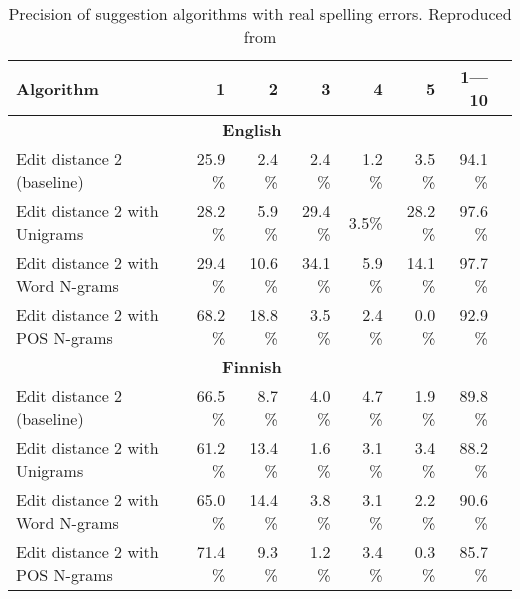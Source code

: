 \documentclass[officiallayout]{unihelcompling}
\begin{document}
\begin{table}
\centering
      \begin{tabular}{lrrrrrrr}
        \hline
        Algorithm & 1 & 2 & 3 & 4 & 5 & 1---10 \\
        \hline
        \multicolumn{7}{c}{\textbf{English}} \\
        \hline
        Edit distance 2 (baseline) 
& 25.9 \% & 2.4 \% & 2.4 \% & 1.2 \% & 3.5 \% & 94.1 \% \\
        \hline
        Edit distance 2 with Unigrams 
& 28.2 \% & 5.9 \% & 29.4 \% & 3.5\% & 28.2 \% & 97.6 \% \\
        \hline
        Edit distance 2 with Word N-grams 
& 29.4 \% & 10.6 \% & 34.1 \% & 5.9 \% & 14.1 \% & 97.7 \% \\
        \hline
        Edit distance 2 with POS N-grams 
& 68.2 \% & 18.8 \% & 3.5 \% & 2.4 \% & 0.0 \% & 92.9 \% \\
\hline
        \multicolumn{7}{c}{\textbf{Finnish}} \\
        \hline
        Edit distance 2 (baseline)
& 66.5 \% & 8.7 \% & 4.0 \% & 4.7 \% & 1.9 \% & 89.8 \% \\
        \hline
        Edit distance 2 with Unigrams 
& 61.2 \% & 13.4 \% & 1.6 \% & 3.1 \% & 3.4 \% & 88.2 \% \\
        \hline
        Edit distance 2 with Word N-grams
& 65.0 \% & 14.4 \% & 3.8 \% & 3.1 \% & 2.2 \% & 90.6 \% \\
        \hline
        Edit distance 2 with POS N-grams
& 71.4 \% & 9.3 \% & 1.2 \% & 3.4 \% & 0.3 \% & 85.7 \% \\
        \hline
    \end{tabular}
  \caption{Precision of suggestion algorithms with real spelling errors.
      Reproduced from 
  \label{table:repro-2012-cicling}}

\end{table}
\end{document}

